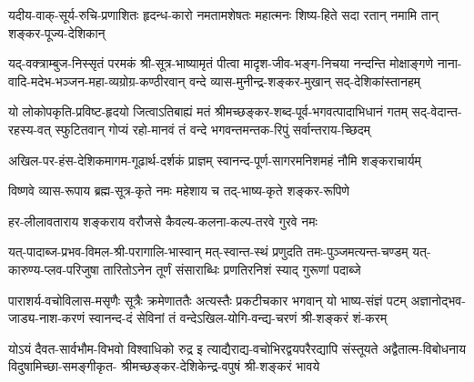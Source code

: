 
\fourlineindentedshloka
{यदीय-वाक्-सूर्य-रुचि-प्रणाशितः}
{हृदन्ध-कारो नमतामशेषतः}
{महात्मनः शिष्य-हिते सदा रतान्}
{नमामि तान् शङ्कर-पूज्य-देशिकान्}


\fourlineindentedshloka
{यद्-वक्त्राम्बुज-निस्सृतं परमकं श्री-सूत्र-भाष्यामृतं}
{पीत्वा मादृश-जीव-भङ्ग-निचया नन्दन्ति मोक्षाङ्गणे}
{नाना-वादि-मदेभ-भञ्जन-महा-व्यग्रोग्र-कण्ठीरवान्}
{वन्दे व्यास-मुनीन्द्र-शङ्कर-मुखान् सद्-देशिकांस्तानहम्}


\fourlineindentedshloka
{यो लोकोपकृति-प्रविष्ट-हृदयो जित्वाऽतिबाह्यं मतं}
{श्रीमच्छङ्कर-शब्द-पूर्व-भगवत्पादाभिधानं गतम्}
{सद्-वेदान्त-रहस्य-वत् स्फुटितवान् गोप्यं रहो-मानवं}
{तं वन्दे भगवन्तमन्तक-रिपुं सर्वान्तराय-च्छिदम्}


\twolineshloka
{अखिल-पर-हंस-देशिकमागम-गूढार्थ-दर्शकं प्राज्ञम्}
{स्वानन्द-पूर्ण-सागरमनिशमहं नौमि शङ्कराचार्यम्}


\twolineshloka
{विष्णवे व्यास-रूपाय ब्रह्म-सूत्र-कृते नमः}
{महेशाय च तद्-भाष्य-कृते शङ्कर-रूपिणे}


\twolineshloka
{हर-लीलावताराय शङ्कराय वरौजसे}
{कैवल्य-कलना-कल्प-तरवे गुरवे नमः}


\fourlineindentedshloka
{यत्-पादाब्ज-प्रभव-विमल-श्री-परागालि-भास्वान्}
{मत्-स्वान्त-स्थं प्रणुदति तमः-पुञ्जमत्यन्त-चण्डम्}
{यत्-कारुण्य-प्लव-परिजुषा तारितोऽनेन तूर्णं}
{संसाराब्धिः प्रणतिरनिशं स्याद् गुरूणां पदाब्जे}


\fourlineindentedshloka
{पाराशर्य-वचोविलास-मसृणैः सूत्रैः क्रमेणाततैः}
{अत्यस्तैः प्रकटीचकार भगवान् यो भाष्य-संज्ञं पटम्}
{अज्ञानोद्भव-जाड्य-नाश-करणं स्वानन्द-दं सेविनां}
{तं वन्देऽखिल-योगि-वन्द्य-चरणं श्री-शङ्करं शं-करम्}


\fourlineindentedshloka
{योऽयं दैवत-सार्वभौम-विभवो विश्वाधिको रुद्र इ}
{त्याद्यैराद्य-वचोभिरद्वयपरैरद्यापि संस्तूयते}
{अद्वैतात्म-विबोधनाय विदुषामिच्छा-समङ्गीकृत-}
{श्रीमच्छङ्कर-देशिकेन्द्र-वपुषं श्री-शङ्करं भावये}


